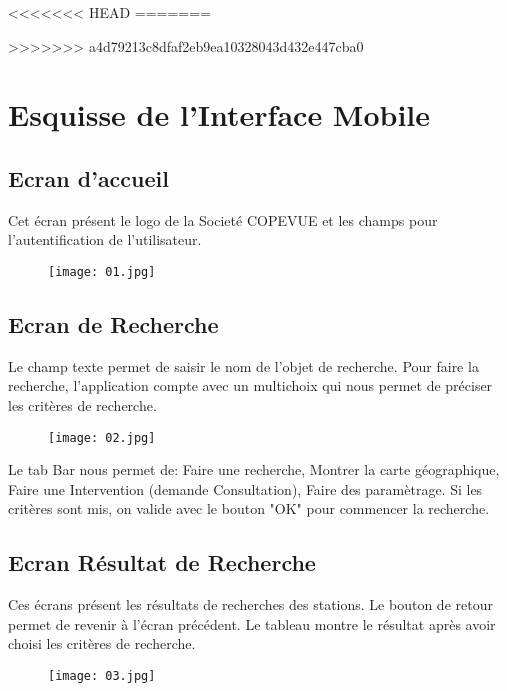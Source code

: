 
<<<<<<< HEAD
=======
\usepackage{graphicx}

>>>>>>> a4d79213c8dfaf2eb9ea10328043d432e447cba0

\section{Esquisse de l'Interface Mobile}

\subsection{Ecran d'accueil}
Cet écran présent le logo de la Societé COPEVUE et les champs pour l'autentification
de l'utilisateur.

\begin{figure}[!h] 
\begin{center}
\texttt{[image: 01.jpg]} 
\end{center} 
\end{figure} 

\subsection{Ecran de Recherche}
Le champ texte permet de saisir le nom de l'objet de recherche.
Pour faire la recherche, l'application compte avec un multichoix qui nous permet de préciser les critères de recherche.

\begin{figure}[!h]
\begin{center}
\texttt{[image: 02.jpg]}
\end{center} 
\end{figure} 

Le tab Bar nous permet de: Faire une recherche, Montrer la carte géographique, Faire une Intervention (demande Consultation), Faire des paramètrage. 
Si les critères sont mis, on valide avec le bouton "OK" pour commencer la recherche.\newpage

\subsection{Ecran Résultat de Recherche}
Ces écrans présent les résultats de recherches des stations.
Le bouton de retour permet de revenir à l'écran précédent.
Le tableau montre le résultat après avoir choisi les critères de recherche.

\begin{figure}[!h] 
\begin{center}
\texttt{[image: 03.jpg]} 
\end{center}
\end{figure} 

